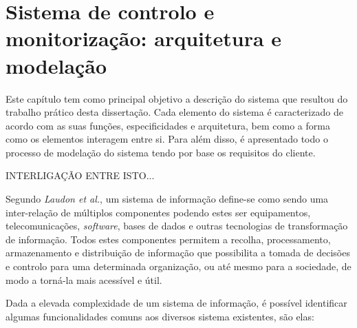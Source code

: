 

\chapter{Sistema de controlo e monitorização: arquitetura e modelação}


Este capítulo tem como principal objetivo a descrição do sistema que resultou do trabalho prático
desta dissertação. Cada elemento do sistema é caracterizado de acordo com as suas funções, especificidades e arquitetura, bem como a forma como os elementos interagem entre si. Para além disso, é apresentado todo o processo de modelação do sistema tendo por base os requisitos do cliente.

 

INTERLIGAÇÃO ENTRE ISTO...








Segundo \textit{Laudon et al.}\cite{Laudon1998}, um sistema de informação define-se como sendo uma inter-relação de múltiplos componentes podendo estes ser equipamentos, telecomunicações, \textit{software}, bases de dados e outras tecnologias de transformação de informação. Todos estes componentes permitem a recolha, processamento, armazenamento e distribuição de informação que possibilita a tomada de decisões e controlo para uma determinada organização, ou até mesmo para a sociedade, de modo a torná-la mais acessível e útil.

Dada a elevada complexidade de um sistema de informação, é possível identificar algumas funcionalidades comuns aos diversos sistema existentes, são elas\cite{Turban1996}: 

